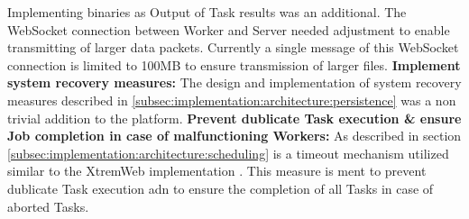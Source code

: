 Implementing binaries as Output of Task results was an additional. The WebSocket connection between Worker and Server needed adjustment to enable transmitting of larger data packets. Currently a single message of this WebSocket connection is limited to 100MB to ensure transmission of larger files.
\newline
\newline
\textbf{Implement system recovery measures:}
\newline
The design and implementation of system recovery measures described in \ref{subsec:implementation:architecture:persistence} was a non trivial addition to the platform.
\newline
\newline
\textbf{Prevent dublicate Task execution \& ensure Job completion in case of malfunctioning Workers:}
\newline
As described in section \ref{subsec:implementation:architecture:scheduling} is a timeout mechanism utilized  similar to the XtremWeb implementation \cite{relatedwork:xtremweb}. This measure is ment to prevent dublicate Task execution adn to ensure the completion of all Tasks in case of aborted Tasks. 